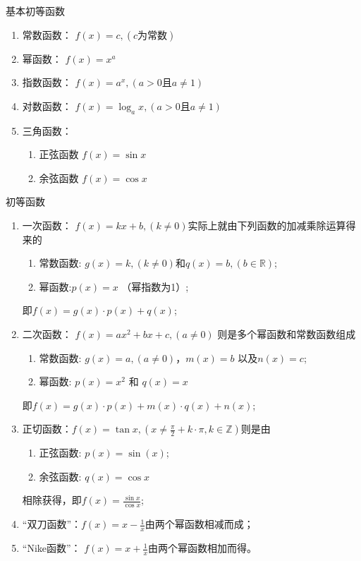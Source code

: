 \begin{definition}{基本初等函数}{}
\begin{enumerate}
\item 常数函数： $f(x) = c, (c为常数)$
\item 幂函数： $f(x) = x^a$
\item 指数函数： $f(x) = a^x, (a>0 \mbox{且} a \neq 1)$
\item 对数函数： $f(x) = \log_{a}{x}, (a>0 \mbox{且} a \neq 1)$
\item 三角函数：
\begin{enumerate}
\item 正弦函数 $f(x) = \sin{x}$
\item 余弦函数 $f(x) = \cos{x}$
\end{enumerate}
\end{enumerate}
\end{definition}

\begin{definition}{初等函数}{}
\begin{enumerate}
\item 一次函数： $f(x) = kx + b, (k \neq 0)$实际上就由下列函数的加减乘除运算得来的
\begin{enumerate}
\item 常数函数: $g(x) = k, (k \neq 0)$和$q(x) = b, (b \in \mathbb{R})$;
\item 幂函数:$p(x) = x$ （幂指数为1）;
\end{enumerate} 
即$f(x) = g(x) \cdot p(x) + q(x)$;
\item 二次函数： $f(x) = ax^2 + bx + c, (a \neq 0)$ 则是多个幂函数和常数函数组成
\begin{enumerate}
\item 常数函数: $g(x) = a, (a \neq 0)$，$m(x) = b$ 以及$n(x) = c$;
\item 幂函数: $p(x) = x^2$ 和 $q(x)=x$
\end{enumerate}
即$f(x) = g(x) \cdot p(x) + m(x) \cdot q(x) + n(x)$;
\item 正切函数：$\displaystyle f(x) = \tan{x}, (x \neq \frac{\pi}{2} + k \cdot \pi, k \in \mathbb{Z})$则是由
\begin{enumerate}
\item 正弦函数: $p(x) = \sin(x)$;
\item 余弦函数: $q(x) = \cos{x}$
\end{enumerate} 
\vspace{2mm} 相除获得，即$\displaystyle f(x) = \frac{\sin{x}}{\cos{x}}$; 
\item \vspace{2mm} “双刀函数”：$\displaystyle f(x) = x - \frac{1}{x}$由两个幂函数相减而成；
\item \vspace{2mm} “Nike函数”： $\displaystyle f(x) = x + \frac{1}{x}$由两个幂函数相加而得。
\end{enumerate}
\end{definition}

